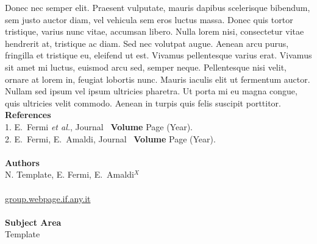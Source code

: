 \documentclass[twocolumn,twoside,10pt,nodate]{article}
\begin{document}
Donec nec semper elit. Praesent vulputate, mauris dapibus scelerisque bibendum, sem justo auctor diam, vel vehicula sem eros luctus massa. Donec quis tortor tristique, varius nunc vitae, accumsan libero. Nulla lorem nisi, consectetur vitae hendrerit at, tristique ac diam. Sed nec volutpat augue. Aenean arcu purus, fringilla et tristique eu, eleifend ut est. Vivamus pellentesque varius erat. Vivamus sit amet mi luctus, euismod arcu sed, semper neque. Pellentesque nisi velit, ornare at lorem in, feugiat lobortis nunc. Mauris iaculis elit ut fermentum auctor. Nullam sed ipsum vel ipsum ultricies pharetra. Ut porta mi eu magna congue, quis ultricies velit commodo. Aenean in turpis quis felis suscipit porttitor.
\vfill
\small{
\noindent
\textbf{References}
\\
1. E.~Fermi \textit{et al.}, Journal \ \textbf{Volume} Page (Year). 
\\
2. E.~Fermi, E.~Amaldi, Journal \ \textbf{Volume} Page (Year). 
\\
\\
\noindent
\textbf{Authors}
\\
N. Template, E. Fermi, E.~Amaldi$^X$
\\
\\
\url{group.webpage.if.any.it}
\\
\\
\noindent
\textbf{Subject Area}
\\
Template
%
%
%
}
\end{document}
